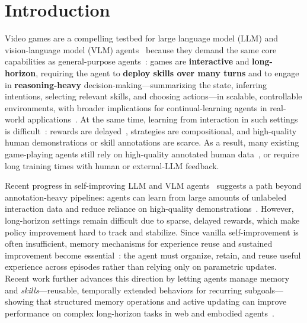 \section{Introduction}
\label{sec:intro}

Video games are a compelling testbed for large language model (LLM) and vision-language model (VLM) agents~\cite{berner2019dota, xu2025agents} because they demand the same core capabilities as general-purpose agents~\cite{wang2023voyager, raad2024scaling}: games are \textbf{interactive} and \textbf{long-horizon}, requiring the agent to \textbf{deploy skills over many turns} and to engage in \textbf{reasoning-heavy} decision-making---summarizing the state, inferring intentions, selecting relevant skills, and choosing actions---in scalable, controllable environments, with broader implications for continual-learning agents in real-world applications~\cite{hu2024survey}. At the same time, learning from interaction in such settings is difficult~\cite{liao2025think, lu2025cultivating}: rewards are delayed~\cite{liu2025agentic}, strategies are compositional, and high-quality human demonstrations or skill annotations are scarce. As a result, many existing game-playing agents still rely on high-quality annotated human data~\cite{hu2023language}, or require long training times with human or external-LLM feedback.

Recent progress in self-improving LLM and VLM agents~\cite{li2025self, wang2025vision, he2025visplay} suggests a path beyond annotation-heavy pipelines: agents can learn from large amounts of unlabeled interaction data and reduce reliance on high-quality demonstrations~\cite{gao2025survey, xiangsystematic}. However, long-horizon settings remain difficult due to sparse, delayed rewards, which make policy improvement hard to track and stabilize. Since vanilla self-improvement is often insufficient, memory mechanisms for experience reuse and sustained improvement become essential~\cite{xu2025mem, sarch2024vlm}: the agent must organize, retain, and reuse useful experience across episodes rather than relying only on parametric updates. Recent work further advances this direction by letting agents manage memory and \emph{skills}---reusable, temporally extended behaviors for recurring subgoals---showing that structured memory operations and active updating can improve performance on complex long-horizon tasks in web and embodied agents~\cite{xia2026skillrl, zhang2026memrl, zhang2026memskill}.

